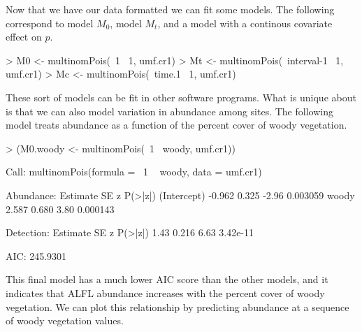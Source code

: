 \documentclass[a4paper]{article}
\renewenvironment{Schunk}{\vspace{\topsep}}{\vspace{\topsep}}
\begin{document}
Now that we have our data formatted we can fit some models. The
following correspond to model $M_0$, model $M_t$, and a model with a
continous covariate effect on $p$.


\begin{Schunk}
\begin{Sinput}
> M0 <- multinomPois(~1 ~1, umf.cr1)
> Mt <- multinomPois(~interval-1 ~1, umf.cr1)
> Mc <- multinomPois(~time.1 ~1, umf.cr1)
\end{Sinput}
\end{Schunk}

These sort of models can be fit in other software programs. What is
unique about  is that we can also model variation in
abundance among sites. The following model treats abundance as
a function of the percent cover of woody vegetation.

\begin{Schunk}
\begin{Sinput}
> (M0.woody <- multinomPois(~1 ~woody, umf.cr1))
\end{Sinput}
\begin{Soutput}
Call:
multinomPois(formula = ~1 ~ woody, data = umf.cr1)

Abundance:
            Estimate    SE     z  P(>|z|)
(Intercept)   -0.962 0.325 -2.96 0.003059
woody          2.587 0.680  3.80 0.000143

Detection:
 Estimate    SE    z  P(>|z|)
     1.43 0.216 6.63 3.42e-11

AIC: 245.9301 
\end{Soutput}
\end{Schunk}


This final model has a much lower AIC score than the other models, and
it indicates
that ALFL abundance increases with the percent cover
of woody vegetation. We can plot this relationship by predicting
abundance at a sequence of woody vegetation values.
\end{document}
